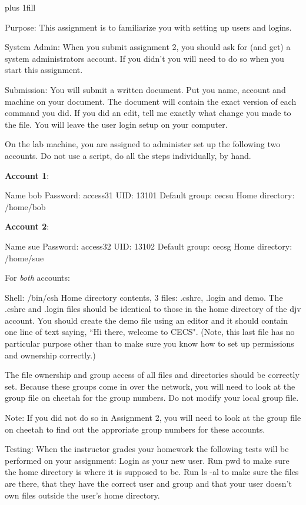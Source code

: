 
\rightskip=0pt plus 1fill

\parindent 0pt

Purpose: This assignment is to familiarize you with setting up users and logins.

System Admin: When you submit assignment 2, you should ask for (and get)
a system administrators account. If you didn't you will need to do so
when you start this assignment.

Submission: You will submit a written document.
Put you name, account and machine on your document.
The document will contain the exact version of each command you did.
If you did an edit, tell me exactly what change you made to the file. 
You will leave the user login setup on your computer.

On the lab machine, you are assigned to administer set up the
following two accounts.
Do not use a script, do all the steps individually, by hand.

{\bf Account 1}:

Name {\ltt{}bob}
\break
Password: access31
\break
UID: {\ltt{}13101}
\break
Default group: {\ltt{}cecsu}
\break
Home directory: {\ltt{}/home/bob}

{\bf Account 2}:

Name {\ltt{}sue}
\break
Password: access32
\break
UID: {\ltt{}13102}
\break
Default group: {\ltt{}cecsg}
\break
Home directory: {\ltt{}/home/sue}

For {\it both} accounts:

Shell: {\ltt{}/bin/csh}
\break
Home directory contents, 3 files:
{\ltt{}.cshrc}, {\ltt{}.login} and {\ltt{}demo}.
\break
The {\ltt{}.cshrc} and {\ltt{}.login} files should be identical to those in
the home directory of the {\ltt{}djv} account.
You should create the {\ltt{}demo} file using an editor
and it should contain one line of text saying,
``Hi there, welcome to CECS". 
(Note, this last file has no particular purpose other than
to make sure you know how to set up permissions and ownership correctly.)

The file ownership and group access of all files and directories
should be correctly set.
Because these groups come in over the network,
you will need to look at the {\ltt{}group} file on {\ltt{}cheetah}
for the group numbers.
Do not modify your local {\ltt{}group} file.

Note:
If you did not do so in Assignment 2,
you will need to look at the group file on cheetah to find out
the approriate group numbers for these accounts.

Testing:
\break
When the instructor grades your homework the following tests will be
performed on your assignment:
Login as your new user. Run {\ltt{}pwd} to make sure the home directory
is where it is supposed to be.
Run {\ltt{}ls -al} to make sure the files are there, that they have
the correct user and group and that your user doesn't own files
outside the user's home directory.
\bye
